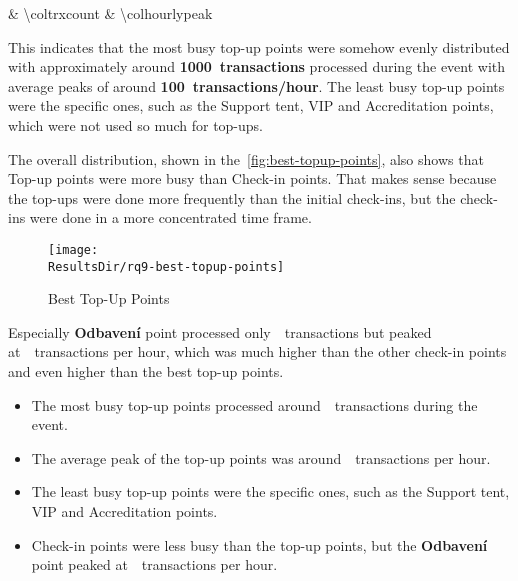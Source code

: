 \begin{table}[htbp]
\begin{tabularx}{\textwidth}
{			& \num[group-separator={,}]{\coltrxcount}
			& \num[group-separator={,}]{\colhourlypeak}
		}
		\noalign{\vspace{1mm}}
		\\
		\noalign{\vspace{1mm}}
		\hline
	\end{tabularx}
	\caption{Best Top-Up Points}
	\label{tab:best-topup-points}
\end{table}

This indicates that the most busy top-up points were somehow evenly distributed with approximately around \textbf{1000~transactions} processed during the event with average peaks of around \textbf{100~transactions/hour}.
The least busy top-up points were the specific ones, such as the Support tent, VIP and Accreditation points, which were not used so much for top-ups.

The overall distribution, shown in the~\autoref{fig:best-topup-points}, also shows that Top-up points were more busy than Check-in points.
That makes sense because the top-ups were done more frequently than the initial check-ins, but the check-ins were done in a more concentrated time frame.

\begin{figure}[H]
	\centering
	\texttt{[image: \\ResultsDir/rq9-best-topup-points]}
	\caption{Best Top-Up Points}
	\label{fig:best-topup-points}
	\source
\end{figure}

Especially \textbf{Odbavení} point processed only~~transactions but peaked at~~transactions per hour, which was much higher than the other check-in points and even higher than the best top-up points.

\begin{keytakeaways}
	\begin{itemize}
		\item The most busy top-up points processed around~~transactions during the event.
		\item The average peak of the top-up points was around~~transactions per hour.
		\item The least busy top-up points were the specific ones, such as the Support tent, VIP and Accreditation points.
		\item Check-in points were less busy than the top-up points, but the \textbf{Odbavení} point peaked at~~transactions per hour.
	\end{itemize}
\end{keytakeaways}

